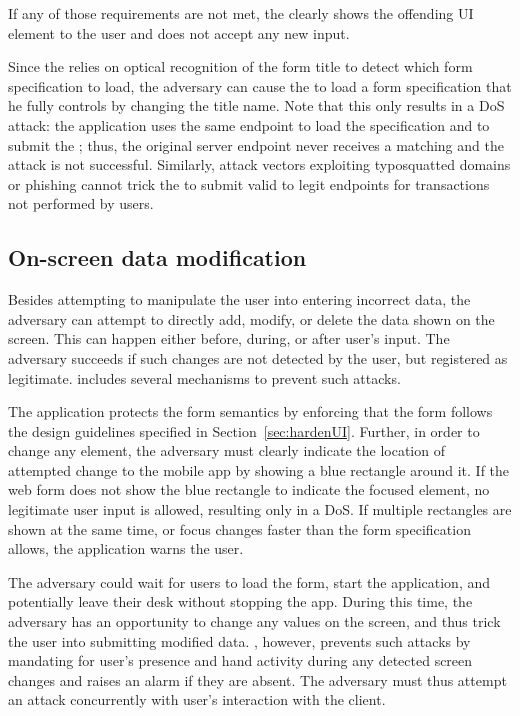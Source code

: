 If any of those requirements are not met, the \app clearly shows the offending UI element to the user and does not accept any new input.

Since the \app relies on optical recognition of the form title to detect which form specification to load, the adversary can cause the \app to load a form specification that he fully controls by changing the title name.
Note that this only results in a DoS attack: the application uses the same endpoint to load the specification and to submit the \POI; thus, the original server endpoint never receives a matching \POI and the attack is not successful.
Similarly, attack vectors exploiting typosquatted domains or phishing cannot trick the \app to submit valid \PsOI to legit endpoints for transactions not performed by users.


\subsection{On-screen data modification}
Besides attempting to manipulate the user into entering incorrect data, the adversary can attempt to directly add, modify, or delete the data shown on the screen. This can happen either before, during, or after user's input. 
The adversary succeeds if such changes are not detected by the user, but registered as legitimate.
\sysname includes several mechanisms to prevent such attacks.


The application protects the form semantics by enforcing that the form follows the design guidelines specified in Section~\ref{sec:hardenUI}.
Further, in order to change any element, the adversary must clearly indicate the location of attempted change to the mobile app by showing a blue rectangle around it.
If the web form does not show the blue rectangle to indicate the focused element, no legitimate user input is allowed, resulting only in a DoS.
If multiple rectangles are shown at the same time, or focus changes faster than the form specification allows, the application warns the user.

The adversary could wait for users to load the form, start the application, and potentially leave their desk without stopping the app.
During this time, the adversary has an opportunity to change any values on the screen, and thus trick the user into submitting modified data.
\sysname, however, prevents such attacks by mandating for user's presence and hand activity during any detected screen changes and raises an alarm if they are absent.
The adversary must thus attempt an attack concurrently with user's interaction with the client.


